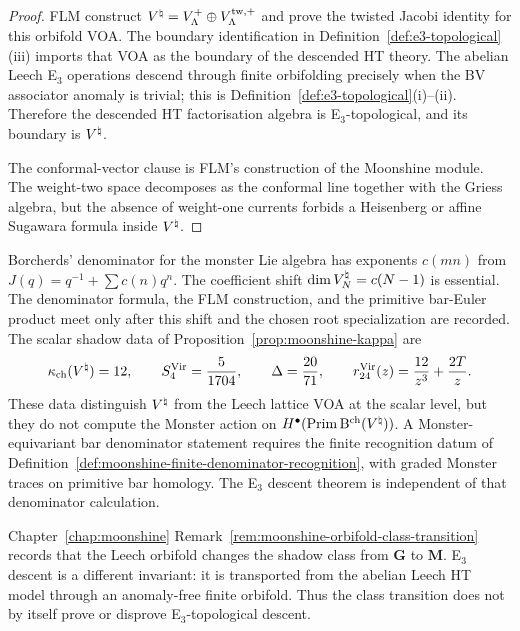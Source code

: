 \begin{proof}
FLM construct
$V^{\natural}=V_\Lambda^+\oplus V_\Lambda^{\mathrm{tw},+}$ and prove the
twisted Jacobi identity for this orbifold VOA.  The boundary
identification in Definition~\ref{def:e3-topological}(iii) imports
that VOA as the boundary of the descended HT theory.  The abelian
Leech E$_3$ operations descend through finite orbifolding precisely
when the BV associator anomaly is trivial; this is
Definition~\ref{def:e3-topological}(i)--(ii).  Therefore the
descended HT factorisation algebra is E$_3$-topological, and its
boundary is $V^{\natural}$.

The conformal-vector clause is FLM's construction of the
Moonshine module.  The weight-two space decomposes as the conformal
line together with the Griess algebra, but the absence of
weight-one currents forbids a Heisenberg or affine Sugawara formula
inside $V^{\natural}$.
\end{proof}

\begin{remark}
\label{rem:vnat-bar-euler-status}
Borcherds' denominator for the monster Lie algebra has exponents
$c(mn)$ from $J(q)=q^{-1}+\sum c(n)q^n$.  The coefficient shift
$\dim V^{\natural}_N=c(N-1)$ is essential.  The denominator formula, the
FLM construction, and the primitive bar-Euler product meet only after
this shift and the chosen root specialization are recorded.  The
scalar shadow data of Proposition~\ref{prop:moonshine-kappa} are
\[
 \kappa_{\mathrm{ch}}(V^{\natural})=12,\qquad
 S_4^{\mathrm{Vir}}=\frac{5}{1704},\qquad
 \Delta=\frac{20}{71},\qquad
 r^{\mathrm{Vir}}_{24}(z)=\frac{12}{z^3}+\frac{2T}{z}.
\]
These data distinguish $V^{\natural}$ from the Leech lattice VOA at the
scalar level, but they do not compute the Monster action on
$H^\bullet(\operatorname{Prim}\mathrm B^{\mathrm{ch}}(V^{\natural}))$.  A Monster-equivariant
bar denominator statement requires the finite recognition datum of
Definition~\ref{def:moonshine-finite-denominator-recognition}, with
graded Monster traces on primitive bar homology.  The E$_3$ descent
theorem is independent of that denominator calculation.
\end{remark}

\begin{remark}
\label{rem:vnat-class-transition-clarified}
Chapter~\ref{chap:moonshine}
Remark~\ref{rem:moonshine-orbifold-class-transition} records that
the Leech orbifold changes the shadow class from $\mathbf G$ to
$\mathbf M$.  E$_3$ descent is a different invariant: it is transported
from the abelian Leech HT model through an anomaly-free finite
orbifold.  Thus the class transition does not by itself prove or
disprove E$_3$-topological descent.
\end{remark}

